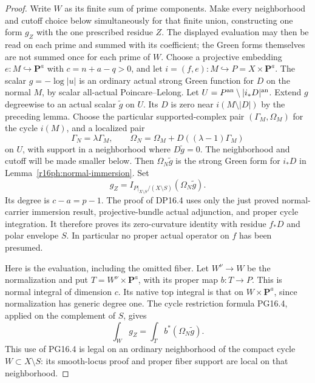 \begin{proof}
Write $W$ as its finite sum of prime components.  Make every
neighborhood and cutoff choice below simultaneously for that finite
union, constructing one form $g_Z$ with the one prescribed residue
$Z$.  The displayed evaluation may then be read on each prime and
summed with its coefficient; the Green forms themselves are not
summed once for each prime of $W$.  Choose a projective
embedding $e:M\hookrightarrow\mathbf P^a$ with
$c=n+a-q>0$, and let $i=(f,e):M\hookrightarrow P=X\times\mathbf P^a$.
The scalar $g=-\log|u|$ is an ordinary actual strong Green function
for $D$ on the normal $M$, by scalar all-actual Poincare--Lelong.
Let $U=P^{\rm an}\setminus|i_*D|^{\rm an}$.
Extend $g$ degreewise to an actual scalar $\widetilde g$ on $U$.
Its $D$ is zero near $i(M\setminus|D|)$ by the preceding lemma.
Choose the particular supported-complex pair $(\Gamma_M,\Omega_M)$
for the cycle $i(M)$, and a localized pair
\[
 \Gamma_N=\lambda\Gamma_M,\qquad
 \Omega_N=\Omega_M+D((\lambda-1)\Gamma_M)
 \tag{PH16.3}\label{r16ph:localized}
\]
on $U$, with support in a neighborhood where $D\widetilde g=0$.
The neighborhood and cutoff will be made smaller below.
Then $\Omega_N\widetilde g$ is the strong Green form for $i_*D$
in Lemma~\ref{r16ph:normal-immersion}.  Set
\[
 g_Z=I_{P|_{X\setminus S}/(X\setminus S)}
                  (\Omega_N\widetilde g).
 \tag{PH16.4}\label{r16ph:bundle-output}
\]
Its degree is $c-a=p-1$.  The proof of DP16.4 uses only the
just proved normal-carrier immersion result, projective-bundle
actual adjunction, and proper cycle integration.  It therefore
proves its zero-curvature identity with residue $f_*D$ and polar
envelope $S$.  In particular no proper actual operator on $f$
has been presumed.

Here is the evaluation, including the omitted fiber.
Let $W^\nu\to W$ be the normalization and put
$T=W^\nu\times\mathbf P^a$, with its proper map $b:T\to P$.
This is normal integral of dimension $c$.  Its native top integral
is that on $W\times\mathbf P^a$, since normalization has generic
degree one.  The cycle restriction formula PG16.4, applied on
the complement of $S$, gives
\[
          \int_W g_Z=\int_T b^*(\Omega_N\widetilde g).
 \tag{PH16.5}\label{r16ph:top-evaluation}
\]
This use of PG16.4 is legal on an ordinary neighborhood of the
compact cycle $W\subset X\setminus S$: its smooth-locus proof
and proper fiber support are local on that neighborhood.


\end{proof}
